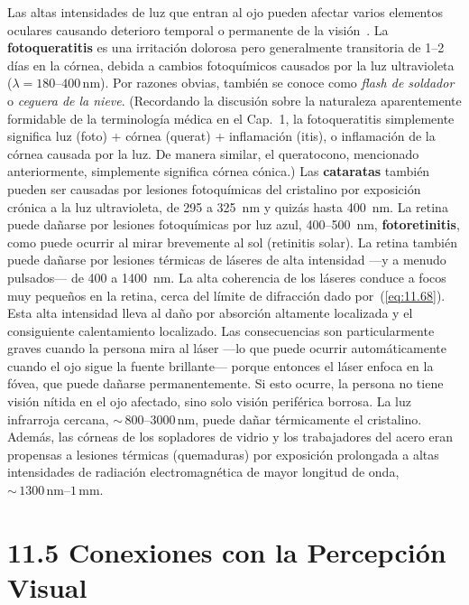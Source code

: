 \documentclass[12pt]{book}
\begin{document}
Las altas intensidades de luz que entran al ojo pueden afectar varios elementos oculares causando deterioro temporal o permanente de la visión~\cite{53}. La \textbf{fotoqueratitis} es una irritación dolorosa pero generalmente transitoria de 1--2 días en la córnea, debida a cambios fotoquímicos causados por la luz ultravioleta ($\lambda = 180\text{--}400\,\text{nm}$). Por razones obvias, también se conoce como \textit{flash de soldador} o \textit{ceguera de la nieve}. (Recordando la discusión sobre la naturaleza aparentemente formidable de la terminología médica en el Cap.~1, la fotoqueratitis simplemente significa luz (foto) + córnea (querat) + inflamación (itis), o inflamación de la córnea causada por la luz. De manera similar, el queratocono, mencionado anteriormente, simplemente significa córnea cónica.) Las \textbf{cataratas} también pueden ser causadas por lesiones fotoquímicas del cristalino por exposición crónica a la luz ultravioleta, de 295 a 325~nm y quizás hasta 400~nm. La retina puede dañarse por lesiones fotoquímicas por luz azul, 400--500~nm, \textbf{fotoretinitis}, como puede ocurrir al mirar brevemente al sol (retinitis solar). La retina también puede dañarse por lesiones térmicas de láseres de alta intensidad ---y a menudo pulsados--- de 400 a 1400~nm. La alta coherencia de los láseres conduce a focos muy pequeños en la retina, cerca del límite de difracción dado por~(\ref{eq:11.68}). Esta alta intensidad lleva al daño por absorción altamente localizada y el consiguiente calentamiento localizado. Las consecuencias son particularmente graves cuando la persona mira al láser ---lo que puede ocurrir automáticamente cuando el ojo sigue la fuente brillante--- porque entonces el láser enfoca en la fóvea, que puede dañarse permanentemente. Si esto ocurre, la persona no tiene visión nítida en el ojo afectado, sino solo visión periférica borrosa. La luz infrarroja cercana, ${\sim}\,800\text{--}3000\,\text{nm}$, puede dañar térmicamente el cristalino. Además, las córneas de los sopladores de vidrio y los trabajadores del acero eran propensas a lesiones térmicas (quemaduras) por exposición prolongada a altas intensidades de radiación electromagnética de mayor longitud de onda, ${\sim}\,1300\,\text{nm}\text{--}1\,\text{mm}$.


\section{11.5 Conexiones con la Percepción Visual}
\end{document}
